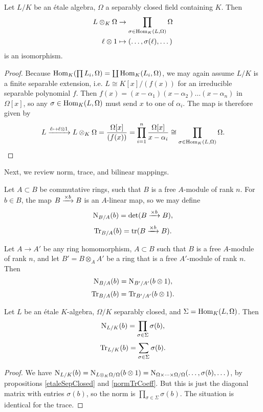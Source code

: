 \documentclass[11pt]{amsart}
\begin{document}
\begin{prop}
\label{etaleSepClosed}
Let $L/K$ be an \'etale algebra, $\Omega$ a separably closed field containing $K$. Then
\begin{align*}
    L\otimes_K \Omega &\to \prod_{\sigma \in \operatorname{Hom}_K(L, \Omega)} \Omega \\
    \ell \otimes 1 &\mapsto (\dots, \sigma(\ell),\dots)
\end{align*}
is an isomorphism.
\end{prop}


\begin{proof}
Because $\operatorname{Hom}_K(\prod L_i, \Omega) = \coprod \operatorname{Hom}_K(L_i, \Omega)$, we may again assume $L/K$ is a finite separable extension, i.e. $L \cong K[x]/(f(x))$ for an irreducible separable polynomial $f$. Then $f(x) = (x - \alpha_1)(x - \alpha_2) \dots (x - \alpha_n)$ in $\Omega[x]$, so any $\sigma\in \operatorname{Hom}_K(L,\Omega)$ must send $x$ to one of $\alpha_i$. The map is therefore given by
\[L \xrightarrow{\ell \mapsto \ell\otimes 1} L\otimes_K \Omega = \frac{\Omega[x]}{(f(x))} = \prod_{i=1}^n \frac{\Omega[x]}{x-\alpha_i} \cong \prod_{\sigma\in \operatorname{Hom}_K(L,\Omega)} \Omega.\]
\end{proof}


Next, we review norm, trace, and bilinear mappings.

\begin{defn}
Let $A\subset B$ be commutative rings, such that $B$ is a free $A$-module of rank $n$. For $b\in B$, the map $B\xrightarrow{\times b} B$ is an $A$-linear map, so we may define
\[\operatorname{N}_{B/A}(b) = \det(B\xrightarrow{\times b} B),\]
\[\operatorname{Tr}_{B/A}(b) = \operatorname{tr}(B\xrightarrow{\times b}B).\]
\end{defn}

\begin{prop}
\label{normTrCoeff}
Let $A\to A'$ be any ring homomorphism, $A\subset B$ such that $B$ is a free $A$-module of rank $n$, and let $B' = B\otimes_A A'$ be a ring that is a free $A'$-module of rank $n$. Then
\[\operatorname{N}_{B/A}(b) = \operatorname{N}_{B'/A'}(b\otimes 1),\]
\[\operatorname{Tr}_{B/A}(b) = \operatorname{Tr}_{B'/A'}(b\otimes 1).\]
\end{prop}

\begin{thm}
Let $L$ be an \'etale $K$-algebra, $\Omega/K$ separably closed, and $\Sigma = \operatorname{Hom}_{K}(L,\Omega)$. Then
\[\operatorname{N}_{L/K}(b) = \prod_{\sigma\in\Sigma} \sigma(b),\]
\[\operatorname{Tr}_{L/K}(b) = \sum_{\sigma\in\Sigma} \sigma(b).\]
\end{thm}

\begin{proof}
We have $\operatorname{N}_{L/K}(b) = \operatorname{N}_{L\otimes_K \Omega/\Omega}(b\otimes 1) = \operatorname{N}_{\Omega\times\dots\times \Omega/\Omega}(\dots, \sigma(b),\dots)$, by propositions \ref{etaleSepClosed} and \ref{normTrCoeff}. But this is just the diagonal matrix with entries $\sigma(b)$, so the norm is $\prod_{\sigma\in\Sigma} \sigma(b)$. The situation is identical for the trace.
\end{proof}
\end{document}
